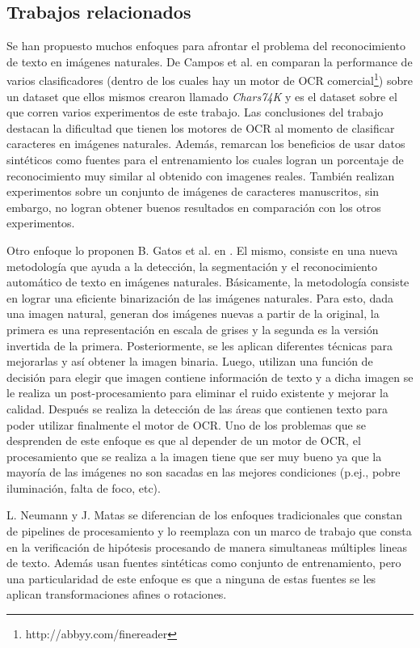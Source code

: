 \subsection{Trabajos relacionados}

	
	Se han propuesto muchos enfoques para afrontar el problema del reconocimiento de texto en imágenes naturales. De Campos et al. en \cite{dCBV09} comparan la performance de varios clasificadores (dentro de los cuales hay un motor de OCR comercial\footnote{http://abbyy.com/finereader}) sobre un dataset que ellos mismos crearon llamado \textit{Chars74K} y es el dataset sobre el que corren varios experimentos de este trabajo. Las conclusiones del trabajo destacan la dificultad que tienen los motores de OCR al momento de clasificar caracteres en imágenes naturales. Además, remarcan los beneficios de usar datos sintéticos como fuentes para el entrenamiento los cuales logran un porcentaje de reconocimiento muy similar al obtenido con imagenes reales. También realizan experimentos sobre un conjunto de imágenes de caracteres manuscritos, sin embargo, no logran obtener buenos resultados en comparación con los otros experimentos. 
	
	Otro enfoque lo proponen B. Gatos et al. en \cite{GPP03}. El mismo, consiste en una nueva metodología que ayuda a la detección, la segmentación y el reconocimiento automático de texto en imágenes naturales. Básicamente, la metodología consiste en lograr una eficiente binarización de las imágenes naturales. Para esto, dada una imagen natural, generan dos imágenes nuevas a partir de la original, la primera es una representación en escala de grises y la segunda es la versión invertida de la primera. Posteriormente, se les aplican diferentes técnicas para mejorarlas y así obtener la imagen binaria. Luego, utilizan una función de decisión para elegir que imagen contiene información de texto y a dicha imagen se le realiza un post-procesamiento para eliminar el ruido existente y mejorar la calidad. Después se realiza la detección de las áreas que contienen texto para poder utilizar finalmente el motor de OCR. Uno de los problemas que se desprenden de este enfoque es que al depender de un motor de OCR, el procesamiento que se realiza a la imagen tiene que ser muy bueno ya que la mayoría de las imágenes no son sacadas en las mejores condiciones (p.ej., pobre iluminación, falta de foco, etc).

	L. Neumann y J. Matas \cite{LNJM} se diferencian de los enfoques tradicionales que constan de pipelines de procesamiento y lo reemplaza con un marco de trabajo que consta en la verificación de hipótesis procesando de manera simultaneas múltiples lineas de texto. Además usan fuentes sintéticas como conjunto de entrenamiento, pero una particularidad de este enfoque es que a ninguna de estas fuentes se les aplican transformaciones afines o rotaciones.
	